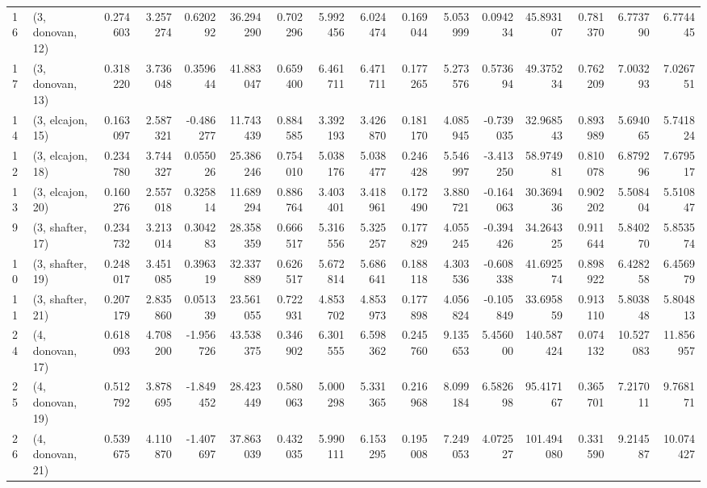 \begin{tabular}{llrrrrrrrrrrrrrr}
16 &  (3, donovan, 12) &   0.274603 &  3.257274 &  0.620292 &  36.294290 &  0.702296 &   5.992456 &  6.024474 &  0.169044 &  5.053999 &  0.094234 &   45.893107 &  0.781370 &   6.773790 &   6.774445 \\
17 &  (3, donovan, 13) &   0.318220 &  3.736048 &  0.359644 &  41.883047 &  0.659400 &   6.461711 &  6.471711 &  0.177265 &  5.273576 &  0.573694 &   49.375234 &  0.762209 &   7.003293 &   7.026751 \\
14 &  (3, elcajon, 15) &   0.163097 &  2.587321 & -0.486277 &  11.743439 &  0.884585 &   3.392193 &  3.426870 &  0.181170 &  4.085945 & -0.739035 &   32.968543 &  0.893989 &   5.694065 &   5.741824 \\
12 &  (3, elcajon, 18) &   0.234780 &  3.744327 &  0.055026 &  25.386246 &  0.754010 &   5.038176 &  5.038477 &  0.246428 &  5.546997 & -3.413250 &   58.974981 &  0.810078 &   6.879296 &   7.679517 \\
13 &  (3, elcajon, 20) &   0.160276 &  2.557018 &  0.325814 &  11.689294 &  0.886764 &   3.403401 &  3.418961 &  0.172490 &  3.880721 & -0.164063 &   30.369436 &  0.902202 &   5.508404 &   5.510847 \\
9  &  (3, shafter, 17) &   0.234732 &  3.213014 &  0.304283 &  28.358359 &  0.666517 &   5.316556 &  5.325257 &  0.177829 &  4.055245 & -0.394426 &   34.264325 &  0.911644 &   5.840270 &   5.853574 \\
10 &  (3, shafter, 19) &   0.248017 &  3.451085 &  0.396319 &  32.337889 &  0.626517 &   5.672814 &  5.686641 &  0.188118 &  4.303536 & -0.608338 &   41.692574 &  0.898922 &   6.428258 &   6.456979 \\
11 &  (3, shafter, 21) &   0.207179 &  2.835860 &  0.051339 &  23.561055 &  0.722931 &   4.853702 &  4.853973 &  0.177898 &  4.056824 & -0.105849 &   33.695859 &  0.913110 &   5.803848 &   5.804813 \\
24 &  (4, donovan, 17) &   0.618093 &  4.708200 & -1.956726 &  43.538375 &  0.346902 &   6.301555 &  6.598362 &  0.245760 &  9.135653 &  5.456000 &  140.587424 &  0.074132 &  10.527083 &  11.856957 \\
25 &  (4, donovan, 19) &   0.512792 &  3.878695 & -1.849452 &  28.423449 &  0.580063 &   5.000298 &  5.331365 &  0.216968 &  8.099184 &  6.582698 &   95.417167 &  0.365701 &   7.217011 &   9.768171 \\
26 &  (4, donovan, 21) &   0.539675 &  4.110870 & -1.407697 &  37.863039 &  0.432035 &   5.990111 &  6.153295 &  0.195008 &  7.249053 &  4.072527 &  101.494080 &  0.331590 &   9.214587 &  10.074427 \\

\end{tabular}
